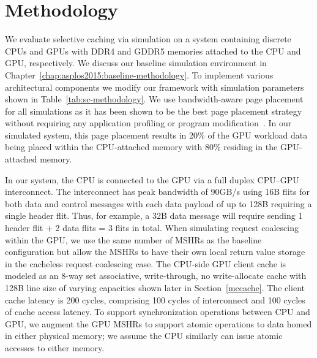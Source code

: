 \vspace{-.05in}
\section{Methodology}
\label{methodology}

We evaluate selective caching via simulation on a system containing discrete
CPUs and GPUs with DDR4 and GDDR5 memories attached to the CPU and GPU,
respectively.  We discuss our baseline simulation environment in
Chapter~\ref{chap:asplos2015:baseline-methodology}.  To implement various architectural components
we modify our framework with simulation parameters shown in
Table~\ref{tab:sc-methodology}.  We use bandwidth-aware page placement for all
simulations as it has been shown to be the best page placement strategy without
requiring any application profiling or program
modification~\cite{ref:agarwal:asplos2015}.
In our simulated system, this page placement results in 20\% of the GPU workload
data being placed within the CPU-attached memory with 80\% residing in the
GPU-attached memory.  

In our system, the CPU is connected to the GPU via a full duplex CPU--GPU
interconnect. The interconnect has peak bandwidth of 90GB/s using 16B flits for
both data and control messages with each data payload of up to 128B requiring a
single header flit.  Thus, for example, a 32B data message will require sending
1 header flit + 2 data flits = 3 flits in total.
When simulating request coalescing within the GPU, we use the same number of
MSHRs as the baseline configuration but allow the MSHRs to have their own local
return value storage in the cacheless request coalescing case.  The CPU-side GPU
client cache is modeled as an 8-way set associative, write-through, no
write-allocate cache with 128B line size of varying capacities shown later in
Section~\ref{mccache}. The client cache latency is 200 cycles, comprising 100
cycles of interconnect and 100 cycles of cache access latency.  To support
synchronization operations between CPU and GPU, we augment the GPU MSHRs to
support atomic operations to data homed in either physical memory; we assume the
CPU similarly can issue atomic accesses to either memory.

